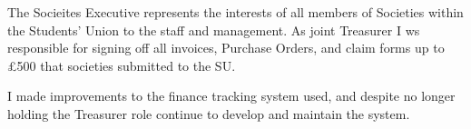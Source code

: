 The Socieites Executive represents the interests of all members of Societies within the Students' Union to the staff and management. As joint Treasurer I ws responsible for signing off all invoices, Purchase Orders, and claim forms up to £500 that societies submitted to the SU.

I made improvements to the finance tracking system used, and despite no longer holding the Treasurer role continue to develop and maintain the system.
\sectionsep